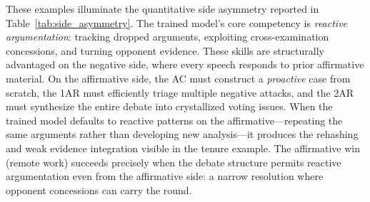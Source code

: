 These examples illuminate the quantitative side asymmetry reported in
Table~\ref{tab:side_asymmetry}. The trained model's core competency is
\emph{reactive argumentation}: tracking dropped arguments, exploiting
cross-examination concessions, and turning opponent evidence. These
skills are structurally advantaged on the negative side, where every
speech responds to prior affirmative material. On the affirmative side,
the AC must construct a \emph{proactive} case from scratch, the 1AR must
efficiently triage multiple negative attacks, and the 2AR must synthesize
the entire debate into crystallized voting issues. When the trained model
defaults to reactive patterns on the affirmative---repeating the same
arguments rather than developing new analysis---it produces the rehashing
and weak evidence integration visible in the tenure example. The
affirmative win (remote work) succeeds precisely when the debate structure
permits reactive argumentation even from the affirmative side: a narrow
resolution where opponent concessions can carry the round.
